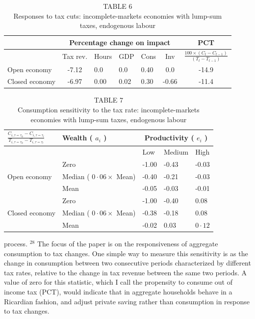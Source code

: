 \documentclass[11pt]{article}
\begin{document}
\begin{table}[h]
\begin{center}
\captionsetup{labelformat=empty}
\caption{TABLE 6\\
Responses to tax cuts: incomplete-markets economies with lump-sum taxes, endogenous labour}
\begin{tabular}{lclllcc}
\hline
 & \multicolumn{5}{c}{Percentage change on impact} & PCT \\
\hline
 & Tax rev. & Hours & GDP & Cons & Inv & $\frac{100 \times\left(C_{t}-C_{t-1}\right)}{\left(T_{t}-T_{t-1}\right)}$ \\
Open economy & -7.12 & 0.0 & 0.0 & 0.40 & 0.0 & -14.9 \\
Closed economy & -6.97 & 0.00 & 0.02 & 0.30 & -0.66 & -11.4 \\
\hline
\end{tabular}
\end{center}
\end{table}

\begin{table}[h]
\begin{center}
\captionsetup{labelformat=empty}
\caption{TABLE 7\\
Consumption sensitivity to the tax rate: incomplete-markets economies with lump-sum taxes, endogenous labour}
\begin{tabular}{|l|l|l|l|l|}
\hline
\multirow[b]{2}{*}{$\frac{C_{i, \tau=\tau_{h}}-C_{i, \tau=\tau_{l}}}{T_{i, \tau=\tau_{h}}-T_{i, \tau=\tau_{l}}}$} & \multirow{2}{*}{Wealth ( $a_{i}$ )} & \multicolumn{3}{|c|}{Productivity ( $e_{i}$ )} \\
\hline
 &  & Low & Medium & High \\
\hline
\multirow{3}{*}{Open economy} & Zero & -1.00 & -0.43 & -0.03 \\
\hline
 & Median ( $0 \cdot 06 \times$ Mean) & -0.40 & -0.21 & -0.03 \\
\hline
 & Mean & -0.05 & -0.03 & -0.01 \\
\hline
\multirow[t]{3}{*}{Closed economy} & Zero & -1.00 & -0.40 & 0.08 \\
\hline
 & Median ( $0 \cdot 06 \times$ Mean) & -0.38 & -0.18 & 0.08 \\
\hline
 & Mean & -0.02 & 0.03 & $0 \cdot 12$ \\
\hline
\end{tabular}
\end{center}
\end{table}

process. ${ }^{28}$ The focus of the paper is on the responsiveness of aggregate consumption to tax changes. One simple way to measure this sensitivity is as the change in consumption between two consecutive periods characterized by different tax rates, relative to the change in tax revenue between the same two periods. A value of zero for this statistic, which I call the propensity to consume out of income tax (PCT), would indicate that in aggregate households behave in a Ricardian fashion, and adjust private saving rather than consumption in response to tax changes.
\end{document}
